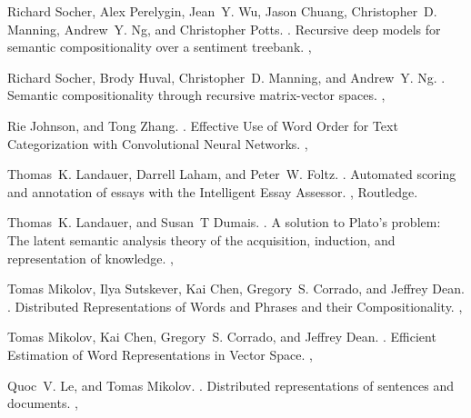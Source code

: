 \def\DevnagVersion{2.15}\documentclass[11pt]{article}
\begin{document}
\begin{thebibliography}{40}
   
Richard Socher, Alex Perelygin, Jean~Y. Wu, Jason Chuang, Christopher~D. Manning, Andrew~Y. Ng, and Christopher Potts.
.
\newblock Recursive deep models for semantic compositionality over a sentiment treebank.
,
  
Richard Socher, Brody Huval, Christopher~D. Manning, and Andrew~Y. Ng.
.
\newblock Semantic compositionality through recursive matrix-vector spaces.
,

Rie Johnson, and Tong Zhang.
.
\newblock Effective Use of Word Order for Text Categorization with Convolutional Neural Networks.
,

Thomas~K. Landauer, Darrell Laham, and Peter~W. Foltz.
.
\newblock Automated scoring and annotation of essays with the Intelligent Essay Assessor.
,
  Routledge. 

Thomas~K. Landauer, and Susan~T Dumais.
.
\newblock A solution to Plato's problem: The latent semantic analysis theory of the acquisition, induction, and representation of knowledge.
,


Tomas Mikolov, Ilya Sutskever, Kai Chen, Gregory~S. Corrado, and Jeffrey Dean.
.
\newblock Distributed Representations of Words and Phrases and their Compositionality.
,


Tomas Mikolov, Kai Chen, Gregory~S. Corrado, and Jeffrey Dean.
.
\newblock Efficient Estimation of Word Representations in Vector Space.
,


Quoc~V. Le, and Tomas Mikolov.
.
\newblock Distributed representations of sentences and documents.
,

   
% 
% 
   
\end{thebibliography}
\end{document}
